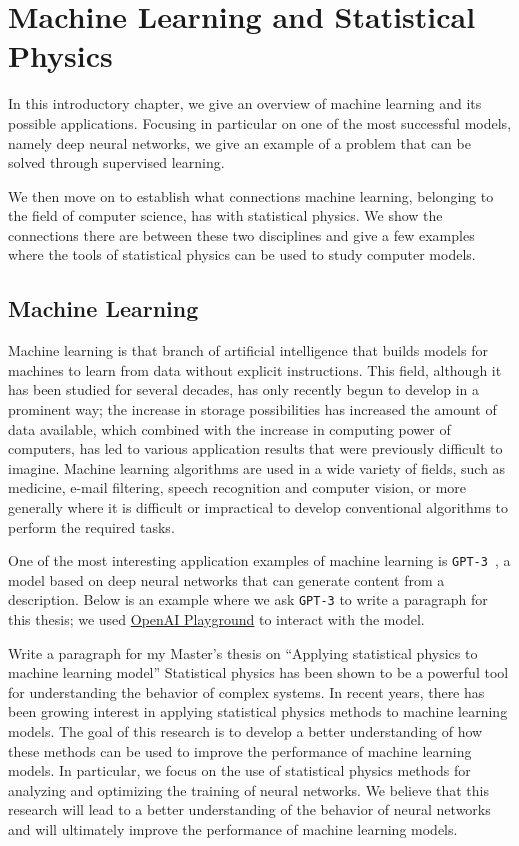 \chapter{Machine Learning and Statistical Physics}
In this introductory chapter, we give an overview of machine learning and its possible applications.
Focusing in particular on one of the most successful models, namely deep neural networks,
we give an example of a problem that can be solved through supervised learning.

We then move on to establish what connections machine learning,
belonging to the field of computer science, has with statistical physics.
We show the connections there are between these two disciplines
 and give a few examples where the tools of statistical physics can be used to study computer models.

 \section{Machine Learning}
 Machine learning is that branch of artificial intelligence that builds models for machines to learn from data without explicit instructions.
 This field, although it has been studied for several decades, has only recently begun to develop in a prominent way;
 the increase in storage possibilities has increased the amount of data available, which combined with the increase in computing power of computers,
 has led to various application results that were previously difficult to imagine.
 Machine learning algorithms are used in a wide variety of fields, such as medicine, e-mail filtering,
 speech recognition and computer vision, or more generally where it is difficult or impractical to develop conventional algorithms to perform the required tasks.

 One of the most interesting application examples of machine learning is \texttt{GPT-3}~\cite{brown2020language},
 a model based on deep neural networks that can generate content from a description.
 Below is an example where we ask \texttt{GPT-3} to write a paragraph for this thesis;
 we used \href{https://beta.openai.com/playground/}{OpenAI Playground} to interact with the model.
\begin{dialogue}
   Write a paragraph for my Master's thesis on ``Applying statistical physics to machine learning model''
   Statistical physics has been shown to be a powerful tool for understanding the behavior of complex systems. In recent years, there has been growing interest in applying statistical physics methods to machine learning models. The goal of this research is to develop a better understanding of how these methods can be used to improve the performance of machine learning models. In particular, we focus on the use of statistical physics methods for analyzing and optimizing the training of neural networks. We believe that this research will lead to a better understanding of the behavior of neural networks and will ultimately improve the performance of machine learning models.
\end{dialogue}

